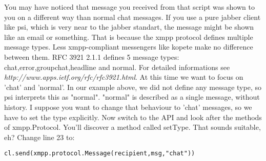 You may have noticed that message you received from that script was shown to you on a different way than normal chat messages. If you use a pure jabber client like psi, which is very near to the jabber standart, the message might be shown like an email or something. That is because the xmpp protocol defines multiple message types. Less xmpp-compliant messengers like kopete make no difference between them.
\newline
\newline
RFC 3921 2.1.1 defines 5 message types:	chat,error,groupchat,headline and normal. For detailed informations see \textit{http://www.apps.ietf.org/rfc/rfc3921.html}.
\newline
At this time we want to focus on 'chat' and 'normal'. In our example above, we did not define any message type, so
psi interprets this as "normal". "normal" is described as a single message, without history. I suppose
you want to change that behaviour to 'chat' messages, so we have to set the type explicitly.
Now switch to the API and look after the methods of xmpp.Protocol. You'll discover a method called setType.
That sounds suitable, eh? Change line 23 to:
\begin{verbatim}
cl.send(xmpp.protocol.Message(recipient,msg,"chat"))
\end{verbatim}















